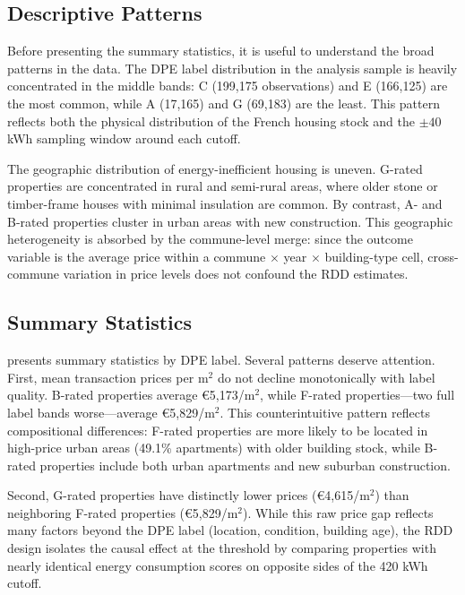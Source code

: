 \documentclass[12pt]{article}
\begin{document}
\subsection{Descriptive Patterns}

Before presenting the summary statistics, it is useful to understand the broad patterns in the data. The DPE label distribution in the analysis sample is heavily concentrated in the middle bands: C (199,175 observations) and E (166,125) are the most common, while A (17,165) and G (69,183) are the least. This pattern reflects both the physical distribution of the French housing stock and the $\pm 40$ kWh sampling window around each cutoff.

The geographic distribution of energy-inefficient housing is uneven. G-rated properties are concentrated in rural and semi-rural areas, where older stone or timber-frame houses with minimal insulation are common. By contrast, A- and B-rated properties cluster in urban areas with new construction. This geographic heterogeneity is absorbed by the commune-level merge: since the outcome variable is the average price within a commune $\times$ year $\times$ building-type cell, cross-commune variation in price levels does not confound the RDD estimates.

\subsection{Summary Statistics}

 presents summary statistics by DPE label. Several patterns deserve attention. First, mean transaction prices per m$^2$ do not decline monotonically with label quality. B-rated properties average \euro 5,173/m$^2$, while F-rated properties---two full label bands worse---average \euro 5,829/m$^2$. This counterintuitive pattern reflects compositional differences: F-rated properties are more likely to be located in high-price urban areas (49.1\% apartments) with older building stock, while B-rated properties include both urban apartments and new suburban construction.

Second, G-rated properties have distinctly lower prices (\euro 4,615/m$^2$) than neighboring F-rated properties (\euro 5,829/m$^2$). While this raw price gap reflects many factors beyond the DPE label (location, condition, building age), the RDD design isolates the causal effect at the threshold by comparing properties with nearly identical energy consumption scores on opposite sides of the 420 kWh cutoff.
\end{document}
